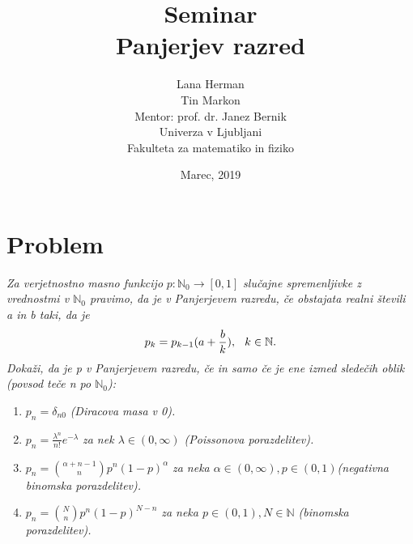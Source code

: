 \documentclass[a4paper]{article}
\title{Seminar \\\vspace{2cm} {\huge Panjerjev razred}\vspace{2cm}}
\author{Lana Herman \\[1.5mm] Tin Markon \\[1.5mm]\vspace{7cm}
Mentor: prof. dr. Janez Bernik \\
Univerza v Ljubljani \\[1.5mm]
Fakulteta za matematiko in fiziko \vspace{3cm}}
\date{Marec, 2019}
\begin{document}
\begin{titlepage}
\clearpage \maketitle
\thispagestyle{empty}
\end{titlepage} 


\tableofcontents
\pagebreak

\maketitle
\section{Problem}
\textit{Za verjetnostno masno funkcijo} $p : \mathbb{N}_{0} \rightarrow [0, 1]$ \textit{slučajne spremenljivke z vrednostmi v $\mathbb{N}_{0}$ pravimo, da je v Panjerjevem razredu, če obstajata realni števili a in b taki, da je}
$$p_k = p_{k-1}(a + \frac{b}{k}), \hspace{0.25cm}  k \in \mathbb{N}.$$
\textit{Dokaži, da je p v Panjerjevem razredu, če in samo če je ene izmed sledečih oblik (povsod teče n po $\mathbb{N}_{0}$):}
\begin{enumerate}
	\item $p_n = \delta_{n0}$ \textit{(Diracova masa v 0).}
	\item $p_n = \frac{\lambda^n}{n!}e^{-\lambda}$ \textit{za nek $\lambda \in (0, \infty)$ (Poissonova porazdelitev).}
	\item $p_n = {{\alpha + n - 1}\choose n}p^n(1-p)^{\alpha}$ \textit{za neka $\alpha \in (0, \infty), p \in (0,1)$(negativna binomska porazdelitev).}
	\item $p_n = {N \choose n}p^n(1-p)^{N-n}$ \textit{za neka $p \in (0,1), N \in \mathbb{N}$ (binomska porazdelitev).}
\end{enumerate}
\vspace{0.5cm}
\end{document}
